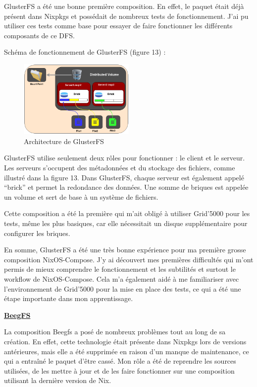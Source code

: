 \documentclass[a4paper,french,12pt, titlepage]{article}
\begin{document}
GlusterFS a été une bonne première composition. En effet, le paquet
était déjà présent dans Nixpkgs et possédait de nombreux tests de
fonctionnement. J'ai pu utiliser ces tests comme base pour essayer de
faire fonctionner les différents composants de ce DFS.\newline

Schéma de fonctionnement de GlusterFS (figure 13) :

\begin{figure}[h]
\centering
\includegraphics[width=0.5\textwidth,height=0.5\textheight,keepaspectratio]{images/shema-gluster.png}
\caption{Architecture de GlusterFS}
\end{figure}

GlusterFS utilise seulement deux rôles pour fonctionner : le client et
le serveur. Les serveurs s'occupent des métadonnées et du stockage des
fichiers, comme illustré dans la figure 13. Dans GlusterFS, chaque
serveur est également appelé ``brick'' et permet la redondance des
données. Une somme de briques est appelée un volume et sert de base à un
système de fichiers.\newline

Cette composition a été la première qui m'ait obligé à utiliser
Grid'5000 pour les tests, même les plus basiques, car elle nécessitait
un disque supplémentaire pour configurer les briques.\newline

En somme, GlusterFS a été une très bonne expérience pour ma première
grosse composition NixOS-Compose. J'y ai découvert mes premières
difficultés qui m'ont permis de mieux comprendre le fonctionnement et
les subtilités et surtout le workflow de NixOS-Compose. Cela m'a
également aidé à me familiariser avec l'environnement de Grid'5000 pour
la mise en place des tests, ce qui a été une étape importante dans mon
apprentissage.\newline

\textbf{\href{https://www.beegfs.io/c/}{BeegFS} \cite{beegfs2014}}

La composition Beegfs a posé de nombreux problèmes tout au long de sa
création. En effet, cette technologie était présente dans Nixpkgs lors
de versions antérieures, mais elle a été supprimée en raison d'un manque
de maintenance, ce qui a entraîné le paquet d'être cassé. Mon rôle a été
de reprendre les sources utilisées, de les mettre à jour et de les faire
fonctionner sur une composition utilisant la dernière version de
Nix.\newline
\end{document}
